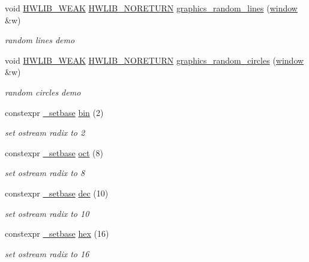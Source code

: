 \begin{DoxyCompactItemize}
\item 
void \hyperlink{hwlib-defines_8hpp_a04be4340016df60d6636c1d1c6d94fc9}{H\+W\+L\+I\+B\+\_\+\+W\+E\+AK} \hyperlink{hwlib-defines_8hpp_aef311f1f416fdcbd1fa22376dcc01029}{H\+W\+L\+I\+B\+\_\+\+N\+O\+R\+E\+T\+U\+RN} \hyperlink{namespacehwlib_ae834adde804bdf781c39695800879a1f}{graphics\+\_\+random\+\_\+lines} (\hyperlink{classhwlib_1_1window}{window} \&w)
\begin{DoxyCompactList}\small\item\em random lines demo \end{DoxyCompactList}\item 
void \hyperlink{hwlib-defines_8hpp_a04be4340016df60d6636c1d1c6d94fc9}{H\+W\+L\+I\+B\+\_\+\+W\+E\+AK} \hyperlink{hwlib-defines_8hpp_aef311f1f416fdcbd1fa22376dcc01029}{H\+W\+L\+I\+B\+\_\+\+N\+O\+R\+E\+T\+U\+RN} \hyperlink{namespacehwlib_a51b02af57df1cd71b9bea0bf5f9fdc63}{graphics\+\_\+random\+\_\+circles} (\hyperlink{classhwlib_1_1window}{window} \&w)
\begin{DoxyCompactList}\small\item\em random circles demo \end{DoxyCompactList}\item 
constexpr \hyperlink{structhwlib_1_1__setbase}{\+\_\+setbase} \hyperlink{namespacehwlib_a2f624a643c9c8d30b5e4f3dca914e28e}{bin} (2)
\begin{DoxyCompactList}\small\item\em set ostream radix to 2 \end{DoxyCompactList}\item 
constexpr \hyperlink{structhwlib_1_1__setbase}{\+\_\+setbase} \hyperlink{namespacehwlib_a9711974fb746e16a55e130b461cad619}{oct} (8)
\begin{DoxyCompactList}\small\item\em set ostream radix to 8 \end{DoxyCompactList}\item 
constexpr \hyperlink{structhwlib_1_1__setbase}{\+\_\+setbase} \hyperlink{namespacehwlib_ab8f3a2357c88d53861c09dbd17f14f1b}{dec} (10)
\begin{DoxyCompactList}\small\item\em set ostream radix to 10 \end{DoxyCompactList}\item 
constexpr \hyperlink{structhwlib_1_1__setbase}{\+\_\+setbase} \hyperlink{namespacehwlib_a4726c8f4bef5591b6f6853041328a04f}{hex} (16)
\begin{DoxyCompactList}\small\item\em set ostream radix to 16 \end{DoxyCompactList}\item 

\end{DoxyCompactItemize}
